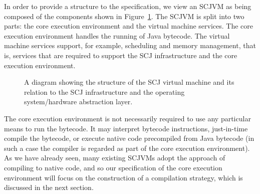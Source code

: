 \documentclass[a4paper,10pt]{report}
\begin{document}
In order to provide a structure to the specification, we view an SCJVM as being
composed of the components shown in Figure~\ref{scjvm-fig}.  The SCJVM is split
into two parts: the core execution environment and the virtual machine
services. The core execution environment handles the running of Java bytecode.
The virtual machine services support, for example, scheduling and memory
management, that is, services that are required to support the SCJ
infrastructure and the core execution environment.

\begin{figure}[ht]
  \centering
  \caption{A diagram showing the structure of the SCJ virtual machine and its
    relation to the SCJ infrastructure and the operating system/hardware
    abstraction layer.}
  \label{scjvm-fig}
\end{figure}

The core execution environment is not necessarily required to use any particular
means to run the bytecode.  It may interpret bytecode instructions, just-in-time
compile the bytecode, or execute native code precompiled from Java bytecode (in
such a case the compiler is regarded as part of the core execution environment).
As we have already seen, many existing SCJVMs adopt the approach of compiling to
native code, and so our specification of the core execution environment will
focus on the construction of a compilation strategy, which is discussed in the
next section.
\end{document}
